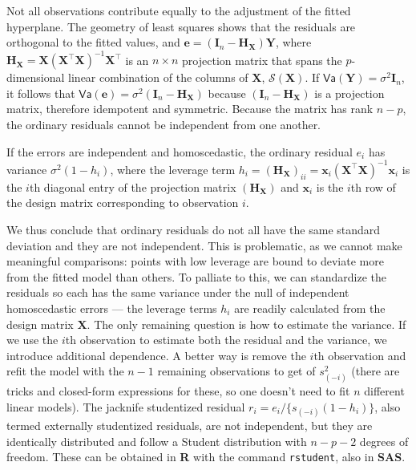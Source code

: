 \documentclass[
  11pt,
  letterpaper,
]{book}
\theoremstyle{definition}
\theoremstyle{definition}
\theoremstyle{definition}
\theoremstyle{remark}
\begin{document}
Not all observations contribute equally to the adjustment of the fitted hyperplane. The geometry of least squares shows that the residuals are orthogonal to the fitted values, and \(\boldsymbol{e} = (\mathbf{I}_n-\mathbf{H}_{\mathbf{X}})\boldsymbol{Y}\), where \(\mathbf{H}_{\mathbf{X}}=\mathbf{X}(\mathbf{X}^\top\mathbf{X})^{-1}\mathbf{X}^\top\) is an \(n \times n\) projection matrix that spans the \(p\)-dimensional linear combination of the columns of \(\mathbf{X}\), \(\mathcal{S}(\mathbf{X})\). If \(\mathsf{Va}(\boldsymbol{Y}) = \sigma^2\mathbf{I}_n\), it follows that \(\mathsf{Va}(\boldsymbol{e})=\sigma^2(\mathbf{I}_n-\mathbf{H}_{\mathbf{X}})\) because \((\mathbf{I}_n-\mathbf{H}_{\mathbf{X}})\) is a projection matrix, therefore idempotent and symmetric. Because the matrix has rank \(n-p\), the ordinary residuals cannot be independent from one another.

If the errors are independent and homoscedastic, the ordinary residual \(e_i\) has variance \(\sigma^2(1-h_{i})\), where the leverage term \(h_i =(\mathbf{H}_{\mathbf{X}})_{ii} = \mathbf{x}_i (\mathbf{X}^\top\mathbf{X})^{-1}\mathbf{x}_i\) is the \(i\)th diagonal entry of the projection matrix \((\mathbf{H}_{\mathbf{X}})\) and \(\mathbf{x}_i\) is the \(i\)th row of the design matrix corresponding to observation \(i\).

We thus conclude that ordinary residuals do not all have the same standard deviation and they are not independent. This is problematic, as we cannot make meaningful comparisons: points with low leverage are bound to deviate more from the fitted model than others. To palliate to this, we can standardize the residuals so each has the same variance under the null of independent homoscedastic errors --- the leverage terms \(h_i\) are readily calculated from the design matrix \(\mathbf{X}\).
The only remaining question is how to estimate the variance. If we use the \(i\)th observation to estimate both the residual and the variance, we introduce additional dependence. A better way is remove the \(i\)th observation and refit the model with the \(n-1\) remaining observations to get of \(s^2_{(-i)}\) (there are tricks and closed-form expressions for these, so one doesn't need to fit \(n\) different linear models). The jacknife studentized residual \(r_i = e_i/\{s_{(-i)}(1-h_i)\}\), also termed externally studentized residuals, are not independent, but they are identically distributed and follow a Student distribution with \(n-p-2\) degrees of freedom.
These can be obtained in \textbf{R} with the command \texttt{rstudent}, also in \textbf{SAS}.
\end{document}
